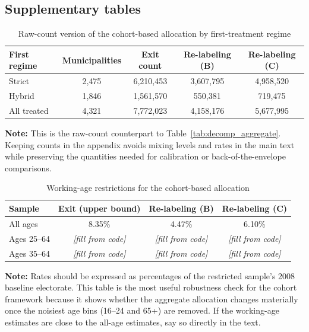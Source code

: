 
\subsection{Supplementary tables}
\label{app:decomp_tables}

\begin{table}[!htbp]
\centering
\caption{Raw-count version of the cohort-based allocation by first-treatment regime}
\label{tab:decomp_counts}
\label{tab:decomp_aggregate_counts_appendix}
\begin{tabular}{lcccc}
\toprule
First regime & Municipalities & Exit count & Re-labeling (B) & Re-labeling (C) \\
\midrule
Strict & 2{,}475 & 6{,}210{,}453 & 3{,}607{,}795 & 4{,}958{,}520 \\
Hybrid & 1{,}846 & 1{,}561{,}570 & 550{,}381 & 719{,}475 \\
All treated & 4{,}321 & 7{,}772{,}023 & 4{,}158{,}176 & 5{,}677{,}995 \\
\bottomrule
\end{tabular}

\vspace{0.75em}
\begin{minipage}{\textwidth}
{\footnotesize \textbf{Note:} This is the raw-count counterpart to Table~\ref{tab:decomp_aggregate}. Keeping counts in the appendix avoids mixing levels and rates in the main text while preserving the quantities needed for calibration or back-of-the-envelope comparisons. \par}
\end{minipage}
\end{table}

\begin{table}[!htbp]
\centering
\caption{Working-age restrictions for the cohort-based allocation}
\label{tab:decomp_workingage}
\begin{tabular}{lccc}
\toprule
Sample & Exit (upper bound) & Re-labeling (B) & Re-labeling (C) \\
\midrule
All ages & 8.35\% & 4.47\% & 6.10\% \\
Ages 25--64 & \textit{[fill from code]} & \textit{[fill from code]} & \textit{[fill from code]} \\
Ages 35--64 & \textit{[fill from code]} & \textit{[fill from code]} & \textit{[fill from code]} \\
\bottomrule
\end{tabular}

\vspace{0.75em}
\begin{minipage}{\textwidth}
{\footnotesize \textbf{Note:} Rates should be expressed as percentages of the restricted sample's 2008 baseline electorate. This table is the most useful robustness check for the cohort framework because it shows whether the aggregate allocation changes materially once the noisiest age bins (16--24 and 65+) are removed. If the working-age estimates are close to the all-age estimates, say so directly in the text. \par}
\end{minipage}
\end{table}

